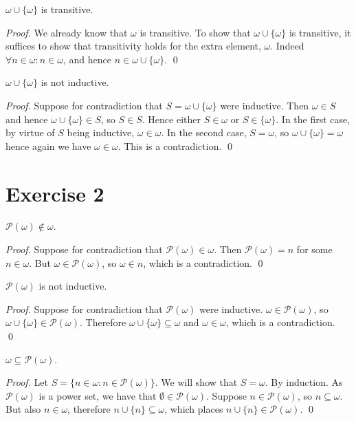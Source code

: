 \documentclass[11pt]{llncs}
\begin{document}
\begin{lemma}
  $\omega \cup \{\omega\}$ is transitive.
\end{lemma}
\begin{proof}
  We already know that $\omega$ is transitive. To show that
  $\omega \cup \{\omega\}$ is transitive, it suffices to show that transitivity
  holds for the extra element, $\omega$. Indeed
  $\forall n \in \omega: n \in \omega$, and hence
  $n \in \omega \cup \{\omega\}$.
  \qed
\end{proof}

\begin{lemma}
  $\omega \cup \{\omega\}$ is not inductive.
\end{lemma}
\begin{proof}
  Suppose for contradiction that $S = \omega \cup \{\omega\}$ were inductive.
  Then $\omega \in S$ and hence $\omega \cup \{\omega\} \in S$, so $S \in S$.
  Hence either $S \in \omega$ or $S \in \{\omega\}$. In the first case, by
  virtue of $S$ being inductive,
  $\omega \in \omega$. In the second case, $S = \omega$, so
  $\omega \cup \{\omega\} = \omega$ hence again we have $\omega \in \omega$.
  This is a contradiction.
  \qed
\end{proof}

\section*{Exercise 2}
\begin{lemma}
  $\mathcal{P}(\omega) \not\in \omega$.
\end{lemma}
\begin{proof}
  Suppose for contradiction that $\mathcal{P}(\omega) \in \omega$.
  Then $\mathcal{P}(\omega) = n$ for some $n \in \omega$. But
  $\omega \in \mathcal{P}(\omega)$, so
  $\omega \in n$, which is a contradiction.
  \qed
\end{proof}

\begin{lemma}
  $\mathcal{P}(\omega)$ is not inductive.
\end{lemma}
\begin{proof}
  Suppose for contradiction that $\mathcal{P}(\omega)$ were inductive.
  $\omega \in \mathcal{P}(\omega)$, so
  $\omega \cup \{\omega\} \in \mathcal{P}(\omega)$. Therefore
  $\omega \cup \{\omega\} \subseteq \omega$ and $\omega \in \omega$, which is
  a contradiction.
  \qed
\end{proof}

\begin{lemma}
  $\omega \subseteq \mathcal{P}(\omega)$.
\end{lemma}
\begin{proof}
  Let $S = \{n \in \omega: n \in \mathcal{P}(\omega)\}$. We will show that
  $S = \omega$. By induction. As $\mathcal{P}(\omega)$ is a power set, we have
  that $\emptyset \in \mathcal{P}(\omega)$. Suppose $n \in \mathcal{P}(\omega)$,
  so $n \subseteq \omega$. But also $n \in \omega$, therefore
  $n \cup \{n\} \subseteq \omega$, which places
  $n \cup \{n\} \in \mathcal{P}(\omega)$.
  \qed
\end{proof}
\end{document}
